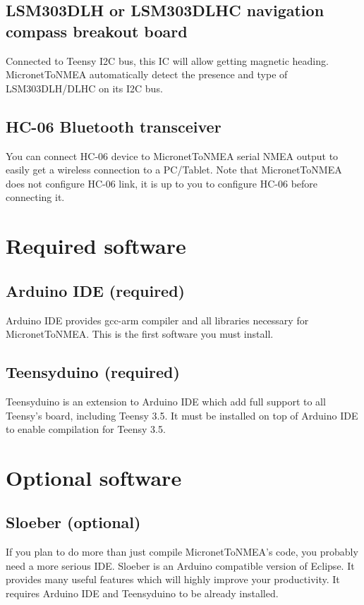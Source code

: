\documentclass{report}
\begin{document}
\subsection{LSM303DLH or LSM303DLHC navigation compass breakout board}

Connected to Teensy I2C bus, this IC will allow getting magnetic heading. MicronetToNMEA automatically detect the presence and type of LSM303DLH/DLHC on its I2C bus.

\subsection{HC-06 Bluetooth transceiver}

You can connect HC-06 device to MicronetToNMEA serial NMEA output to easily get a wireless connection to a PC/Tablet. Note that MicronetToNMEA does not configure HC-06 link, it is up to you to configure HC-06 before connecting it.

\section{Required software}

\subsection{Arduino IDE (required)}
Arduino IDE provides gcc-arm compiler and all libraries necessary for MicronetToNMEA. This is the first software you must install.

\subsection{Teensyduino (required)}

Teensyduino is an extension to Arduino IDE which add full support to all Teensy’s board, including Teensy 3.5. It must be installed on top of Arduino IDE to enable compilation for Teensy 3.5.

\section{Optional software}

\subsection{Sloeber (optional)}

If you plan to do more than just compile MicronetToNMEA’s code, you probably need a more serious IDE. Sloeber is an Arduino compatible version of Eclipse. It provides many useful features which will highly improve your productivity. It requires Arduino IDE and Teensyduino to be already installed.
\end{document}
